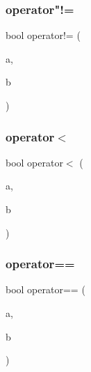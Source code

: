 \subsubsection{\texorpdfstring{operator"!=}{operator!=}}
{\footnotesize\ttfamily bool operator!= (\begin{DoxyParamCaption}\item[{const \mbox{\hyperlink{class_c_net_addr}{C\+Net\+Addr}} \&}]{a,  }\item[{const \mbox{\hyperlink{class_c_net_addr}{C\+Net\+Addr}} \&}]{b }\end{DoxyParamCaption})\hspace{0.3cm}{\ttfamily [friend]}}

\mbox{\label{class_c_net_addr_af220590d55a24354e2ba2e547e34fd77}} 
\subsubsection{\texorpdfstring{operator$<$}{operator<}}
{\footnotesize\ttfamily bool operator$<$ (\begin{DoxyParamCaption}\item[{const \mbox{\hyperlink{class_c_net_addr}{C\+Net\+Addr}} \&}]{a,  }\item[{const \mbox{\hyperlink{class_c_net_addr}{C\+Net\+Addr}} \&}]{b }\end{DoxyParamCaption})\hspace{0.3cm}{\ttfamily [friend]}}

\mbox{\label{class_c_net_addr_a6cc88956853ab8dc9586d55cda059934}} 
\subsubsection{\texorpdfstring{operator==}{operator==}}
{\footnotesize\ttfamily bool operator== (\begin{DoxyParamCaption}\item[{const \mbox{\hyperlink{class_c_net_addr}{C\+Net\+Addr}} \&}]{a,  }\item[{const \mbox{\hyperlink{class_c_net_addr}{C\+Net\+Addr}} \&}]{b }\end{DoxyParamCaption})\hspace{0.3cm}{\ttfamily [friend]}}



